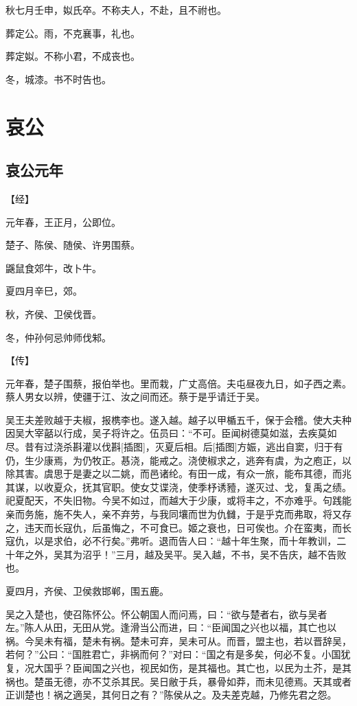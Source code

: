 \documentclass[a4paper,12pt,UTF8,twoside]{ctexbook}
\begin{document}
秋七月壬申，姒氏卒。不称夫人，不赴，且不祔也。

葬定公。雨，不克襄事，礼也。

葬定姒。不称小君，不成丧也。

冬，城漆。书不时告也。


\part{哀公}

\chapter{哀公元年}



【经】

元年春，王正月，公即位。

楚子、陈侯、随侯、许男围蔡。

鼷鼠食郊牛，改卜牛。

夏四月辛巳，郊。

秋，齐侯、卫侯伐晋。

冬，仲孙何忌帅师伐邾。

【传】

元年春，楚子围蔡，报伯举也。里而栽，广丈高倍。夫屯昼夜九日，如子西之素。蔡人男女以辨，使疆于江、汝之间而还。蔡于是乎请迁于吴。

吴王夫差败越于夫椒，报槜李也。遂入越。越子以甲楯五千，保于会稽。使大夫种因吴大宰嚭以行成，吴子将许之。伍员曰：“不可。臣闻树德莫如滋，去疾莫如尽。昔有过浇杀斟灌以伐斟[插图]，灭夏后相。后[插图]方娠，逃出自窦，归于有仍，生少康焉，为仍牧正。惎浇，能戒之。浇使椒求之，逃奔有虞，为之庖正，以除其害。虞思于是妻之以二姚，而邑诸纶。有田一成，有众一旅，能布其德，而兆其谋，以收夏众，抚其官职。使女艾谍浇，使季杼诱豷，遂灭过、戈，复禹之绩。祀夏配天，不失旧物。今吴不如过，而越大于少康，或将丰之，不亦难乎。句践能亲而务施，施不失人，亲不弃劳，与我同壤而世为仇雠，于是乎克而弗取，将又存之，违天而长寇仇，后虽悔之，不可食已。姬之衰也，日可俟也。介在蛮夷，而长寇仇，以是求伯，必不行矣。”弗听。退而告人曰：“越十年生聚，而十年教训，二十年之外，吴其为沼乎！”三月，越及吴平。吴入越，不书，吴不告庆，越不告败也。

夏四月，齐侯、卫侯救邯郸，围五鹿。

吴之入楚也，使召陈怀公。怀公朝国人而问焉，曰：“欲与楚者右，欲与吴者左。”陈人从田，无田从党。逢滑当公而进，曰：“臣闻国之兴也以福，其亡也以祸。今吴未有福，楚未有祸。楚未可弃，吴未可从。而晋，盟主也，若以晋辞吴，若何？”公曰：“国胜君亡，非祸而何？”对曰：“国之有是多矣，何必不复。小国犹复，况大国乎？臣闻国之兴也，视民如伤，是其福也。其亡也，以民为土芥，是其祸也。楚虽无德，亦不艾杀其民。吴日敝于兵，暴骨如莽，而未见德焉。天其或者正训楚也！祸之適吴，其何日之有？”陈侯从之。及夫差克越，乃修先君之怨。
\end{document}
